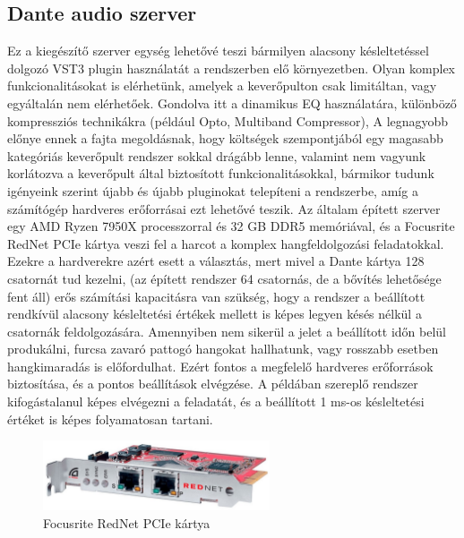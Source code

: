 \subsection{Dante audio szerver}
Ez a kiegészítő szerver egység lehetővé teszi bármilyen alacsony késleltetéssel dolgozó VST3 plugin használatát a rendszerben elő környezetben.
Olyan komplex funkcionalitásokat is elérhetünk, amelyek a keverőpulton csak limitáltan, vagy egyáltalán nem elérhetőek.
Gondolva itt a dinamikus EQ használatára, különböző kompressziós technikákra (például Opto, Multiband Compressor), 
A legnagyobb előnye ennek a fajta megoldásnak, hogy költségek szempontjából egy magasabb kategóriás keverőpult rendszer sokkal drágább lenne,
valamint nem vagyunk korlátozva a keverőpult által biztosított funkcionalitásokkal, bármikor tudunk igényeink szerint újabb és újabb pluginokat
telepíteni a rendszerbe, amíg a számítógép hardveres erőforrásai ezt lehetővé teszik.
Az általam épített szerver egy AMD Ryzen 7950X processzorral és 32 GB DDR5 memóriával, és a Focusrite RedNet PCIe kártya veszi fel a harcot a
komplex hangfeldolgozási feladatokkal. Ezekre a hardverekre azért esett a választás, mert mivel a Dante kártya 128 csatornát tud kezelni, 
(az épített rendszer 64 csatornás, de a bővítés lehetősége fent áll) erős számítási kapacitásra van szükség, hogy a rendszer a beállított rendkívül alacsony
késleltetési értékek mellett is képes legyen késés nélkül a csatornák feldolgozására. Amennyiben nem sikerül a jelet a beállított időn belül
produkálni, furcsa zavaró pattogó hangokat hallhatunk, vagy rosszabb esetben hangkimaradás is előfordulhat. Ezért fontos a megfelelő hardveres
erőforrások biztosítása, és a pontos beállítások elvégzése.
A példában szereplő rendszer kifogástalanul képes elvégezni a feladatát, és a beállított 1 ms-os késleltetési értéket is képes folyamatosan tartani.
\begin{figure}[H]
	\centering
	\includegraphics[width=67mm, keepaspectratio]{figures/rednet_pcie.jpg}
	\caption{Focusrite RedNet PCIe kártya}\label{fig:rednet_pcie}
\end{figure}
